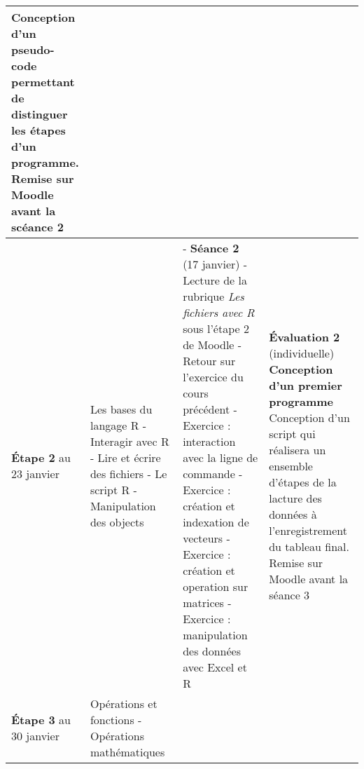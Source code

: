 \documentclass[12]{article}
\begin{document}
\begin{center}
\begin{tabular}{| p{0.1\linewidth} | p{0.3\linewidth} | p{0.3\linewidth} | p{0.3\linewidth} | }
        Conception d'un pseudo-code permettant de distinguer les étapes d'un programme. Remise sur Moodle avant la scéance 2\hfill\hfill \\
        \hline
        \textbf{Étape 2} \linebreak 17 au 23 janvier & 
        Les bases du langage R\hfill\hfill \linebreak\linebreak 
            - Interagir avec R\hfill\hfill \linebreak
            - Lire et écrire des fichiers\hfill\hfill \linebreak
            - Le script R\hfill\hfill \linebreak
            - Manipulation des objects\hfill\hfill &
        - \textbf{Séance 2} (17 janvier)\hfill\hfill \linebreak
        - Lecture de la rubrique \textit{Les fichiers avec R} sous l'étape 2 de Moodle\hfill\hfill \linebreak
        - Retour sur l'exercice du cours précédent\hfill\hfill \linebreak
        - Exercice : interaction avec la ligne de commande\hfill\hfill \linebreak
        - Exercice : création et indexation de vecteurs\hfill\hfill \linebreak
        - Exercice : création et operation sur matrices\hfill\hfill \linebreak
        - Exercice : manipulation des données avec Excel et R\hfill\hfill &
        \textbf{Évaluation 2} (individuelle) \linebreak
        \textbf{Conception d'un premier programme}\hfill\hfill \linebreak
        Conception d'un script qui réalisera un ensemble d'étapes de la lacture
        des données à l'enregistrement du tableau final. Remise sur Moodle
        avant la séance 3\hfill\hfill\hfill \\
        \hline
        \textbf{Étape 3} \linebreak 24 au 30 janvier & 
        Opérations et fonctions\hfill\hfill \linebreak\linebreak 
            - Opérations mathématiques\hfill\hfill \linebreak

\end{tabular}
\end{center}
\end{document}
